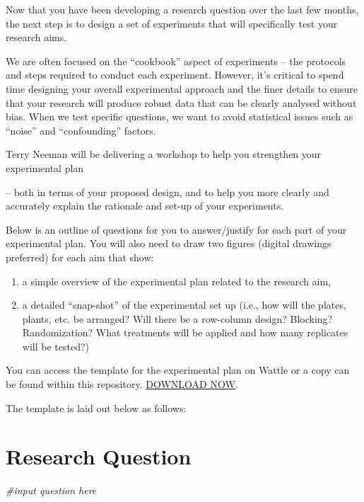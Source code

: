 \documentclass[
]{book}
\newenvironment{Shaded}{\begin{snugshade}}{\end{snugshade}}
\newcommand{\CommentTok}[1]{\textcolor[rgb]{0.56,0.35,0.01}{\textit{#1}}}
\begin{document}
Now that you have been developing a research question over the last few months, the next step is to design a set of experiments that will specifically test your research aims.

We are often focused on the ``cookbook'' aspect of experiments -- the protocols and steps required to conduct each experiment. However, it's critical to spend time designing your overall experimental approach and the finer details to ensure that your research will produce robust data that can be clearly analysed without bias. When we test specific questions, we want to avoid statistical issues such as ``noise'' and ``confounding'' factors.

Terry Neeman will be delivering a workshop to help you strengthen your experimental plan

-- both in terms of your proposed design, and to help you more clearly and accurately explain the rationale and set-up of your experiments.

Below is an outline of questions for you to answer/justify for each part of your experimental plan. You will also need to draw two figures (digital drawings preferred) for each aim that show:

\begin{enumerate}
\def\labelenumi{\arabic{enumi})}
\item
  a simple overview of the experimental plan related to the research aim,
\item
  a detailed ``snap-shot'' of the experimental set up (i.e., how will the plates, plants, etc. be arranged? Will there be a row-column design? Blocking? Randomization? What treatments will be applied and how many replicates will be tested?)
\end{enumerate}

You can access the template for the experimental plan on Wattle or a copy can be found within this repository. \href{\%22pdfs/3.\%20Statistical\%20Methods\%20in\%20Biology\%20-\%20Chapter\%203.pdf\%22}{DOWNLOAD NOW}.

The template is laid out below as follows:

\hypertarget{research-question}{%
\section{Research Question}\label{research-question}}

\begin{Shaded}
\begin{Highlighting}[]
\CommentTok{\#input question here}
\end{Highlighting}
\end{Shaded}
\end{document}
